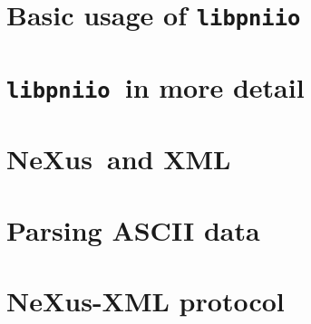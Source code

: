 \documentclass[a4paper,draft]{scrbook}
\newcommand{\libpniio}{\texttt{libpniio}}
\newcommand{\nexus}{NeXus}
\begin{document}
\chapter{Basic usage of \libpniio}\label{chapter:basicusage}

\FloatBarrier


\chapter{\libpniio\ in more detail}\label{chapter:advancedusage}

\FloatBarrier

\chapter{\nexus\ and XML}

\FloatBarrier

\appendix
\chapter{Parsing ASCII data}\label{appendix:parsers}

\FloatBarrier

\chapter{\nexus-XML protocol}\label{appendix:xml_protocol}




\end{document}
